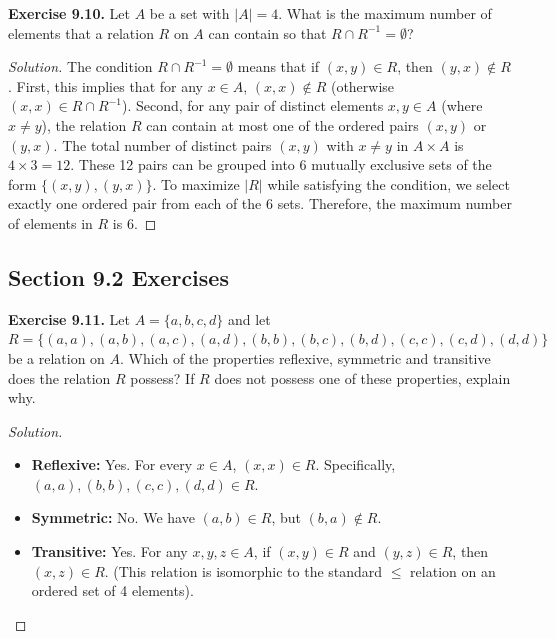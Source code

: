 \documentclass[11pt, a4paper]{article}
\theoremstyle{definition}
\theoremstyle{remark}
\begin{document}
\vspace{1em}
\textbf{Exercise 9.10.} Let $A$ be a set with $|A| = 4$. What is the maximum number of elements that a relation $R$ on $A$ can contain so that $R \cap R^{-1} = \emptyset$?
\begin{proof}[Solution]
The condition $R \cap R^{-1} = \emptyset$ means that if $(x, y) \in R$, then $(y, x) \notin R$.
First, this implies that for any $x \in A$, $(x, x) \notin R$ (otherwise $(x, x) \in R \cap R^{-1}$).
Second, for any pair of distinct elements $x, y \in A$ (where $x \neq y$), the relation $R$ can contain at most one of the ordered pairs $(x, y)$ or $(y, x)$.
The total number of distinct pairs $(x, y)$ with $x \neq y$ in $A \times A$ is $4 \times 3 = 12$.
These 12 pairs can be grouped into 6 mutually exclusive sets of the form $\{(x, y), (y, x)\}$.
To maximize $|R|$ while satisfying the condition, we select exactly one ordered pair from each of the 6 sets.
Therefore, the maximum number of elements in $R$ is 6.
\end{proof}

\subsection{Section 9.2 Exercises}

\textbf{Exercise 9.11.} Let $A = \{a, b, c, d\}$ and let $R = \{(a, a), (a, b), (a, c), (a, d), (b, b), (b, c), (b, d), (c, c), (c, d), (d, d)\}$ be a relation on $A$. Which of the properties reflexive, symmetric and transitive does the relation $R$ possess? If $R$ does not possess one of these properties, explain why.
\begin{proof}[Solution]
\begin{itemize}
    \item \textbf{Reflexive:} Yes. For every $x \in A$, $(x, x) \in R$. Specifically, $(a, a), (b, b), (c, c), (d, d) \in R$.
    \item \textbf{Symmetric:} No. We have $(a, b) \in R$, but $(b, a) \notin R$.
    \item \textbf{Transitive:} Yes. For any $x, y, z \in A$, if $(x, y) \in R$ and $(y, z) \in R$, then $(x, z) \in R$. (This relation is isomorphic to the standard $\le$ relation on an ordered set of 4 elements).
\end{itemize}
\end{proof}
\end{document}
